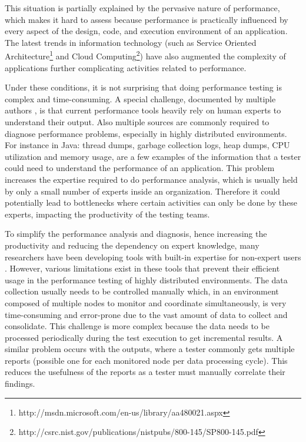 \documentclass[runningheads,a4paper]{llncs}
\begin{document}
This situation is partially explained by the pervasive nature of
performance, which makes it hard to assess because performance is practically
influenced by every aspect of the design, code, and execution environment
of an application. The latest trends in information technology (such
as Service Oriented
Architecture\footnote{http://msdn.microsoft.com/en-us/library/aa480021.aspx} and 
Cloud Computing\footnote{http://csrc.nist.gov/publications/nistpubs/800-145/SP800-145.pdf}) 
have also augmented the complexity of applications further complicating activities related to
performance. 

Under these conditions, it is not surprising that doing performance
testing is complex and time-consuming. A special challenge, documented by
multiple authors \cite{Woodside2007,trevor1,Angelopoulos2012}, is that current
performance tools heavily rely on human experts to understand their
output. Also multiple sources are commonly required to diagnose performance
problems, especially in highly distributed environments. For instance in Java: thread dumps, 
garbage collection logs, heap dumps, CPU utilization and memory usage, are a few
examples of the information that a tester could need to understand the performance 
of an application. This problem increases the expertise required to do
performance analysis, which is usually held by only a small number of experts 
inside an organization\cite{Spear2009}. Therefore it could potentially lead to
bottlenecks where certain activities can only be done by these experts,
impacting the productivity of the testing teams\cite{Angelopoulos2012}.

To simplify the performance analysis and diagnosis, hence increasing the
productivity and reducing the dependency on expert knowledge, many researchers
have been developing tools with built-in expertise for non-expert
users \cite{Altman2010,pat7,Angelopoulos2012}. However, various limitations
exist in these tools that prevent their efficient usage in the performance
testing of highly distributed environments. The data collection usually needs
to be controlled manually which, in an environment composed of multiple nodes to
monitor and coordinate simultaneously, is very time-consuming and error-prone
due to the vast amount of data to collect and consolidate. This challenge is
more complex because the data needs to be processed periodically during the
test execution to get incremental results. A similar problem occurs 
with the outputs, where a tester commonly gets multiple
reports (possible one for each monitored node per data processing cycle). This
reduces the usefulness of the reports as a tester must manually
correlate their findings.
\end{document}
